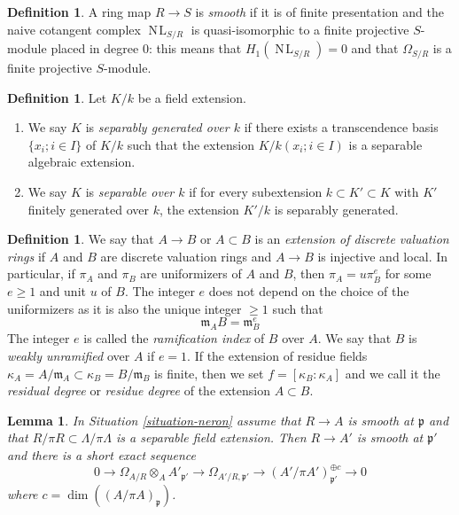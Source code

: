 \documentclass{amsart}
\theoremstyle{plain}
\newtheorem{lemma}[subsection]{Lemma}
\theoremstyle{definition}
\newtheorem{definition}[subsection]{Definition}
\theoremstyle{remark}
\numberwithin{equation}{subsection}
\def\NL{\mathop{N\!L}\nolimits}
\begin{document}
\begin{definition}
\label{algebra-definition-smooth}
A ring map $R \to S$ is {\it smooth} if it is of finite presentation
and the naive cotangent complex $\NL_{S/R}$ is quasi-isomorphic to a
finite projective $S$-module placed in degree $0$: this means
that $H_1(\NL_{S/R}) = 0$ and that $\Omega_{S/R}$ is a finite projective
$S$-module.
\end{definition}

\begin{definition}
\label{algebra-definition-separable-field-extension}
Let $K/k$ be a field extension.
\begin{enumerate}
\item We say $K$ is {\it separably generated over $k$} if there exists
a transcendence basis $\{x_i; i \in I\}$ of $K/k$ such that the extension
$K/k(x_i; i \in I)$ is a separable algebraic extension.
\item We say $K$ is {\it separable over $k$} if for every subextension
$k \subset K' \subset K$ with $K'$ finitely generated
over $k$, the extension $K'/k$ is separably generated.
\end{enumerate}
\end{definition}

\begin{definition}
\label{more-algebra-definition-extension-discrete-valuation-rings}
We say that $A \to B$ or $A \subset B$ is an
{\it extension of discrete valuation rings} if $A$ and $B$ are
discrete valuation rings and $A \to B$ is injective and local.
In particular, if $\pi_A$ and $\pi_B$ are uniformizers of
$A$ and $B$, then $\pi_A = u \pi_B^e$ for some $e \geq 1$ and unit
$u$ of $B$. The integer $e$ does not depend on the choice of
the uniformizers as it is also the unique integer $\geq 1$ such that
$$
\mathfrak m_A B = \mathfrak m_B^e
$$
The integer $e$ is called the {\it ramification index} of $B$ over $A$.
We say that $B$ is {\it weakly unramified} over $A$ if $e = 1$.
If the extension of residue fields
$\kappa_A = A/\mathfrak m_A \subset \kappa_B = B/\mathfrak m_B$
is finite, then we set $f = [\kappa_B : \kappa_A]$ and we
call it the {\it residual degree} or {\it residue degree}
of the extension $A \subset B$.
\end{definition}

\begin{lemma}
\label{lemma-neron-blowup-smooth}
In Situation \ref{situation-neron} assume that $R \to A$ is smooth
at $\mathfrak p$ and that $R/\pi R \subset \Lambda/\pi \Lambda$
is a separable field extension. Then $R \to A'$ is smooth at
$\mathfrak p'$ and there is a short exact sequence
$$
0 \to
\Omega_{A/R} \otimes_A A'_{\mathfrak p'} \to
\Omega_{A'/R, \mathfrak p'} \to
(A'/\pi A')_{\mathfrak p'}^{\oplus c} \to 0
$$
where $c = \dim((A/\pi A)_\mathfrak p)$.
\end{lemma}
\end{document}
